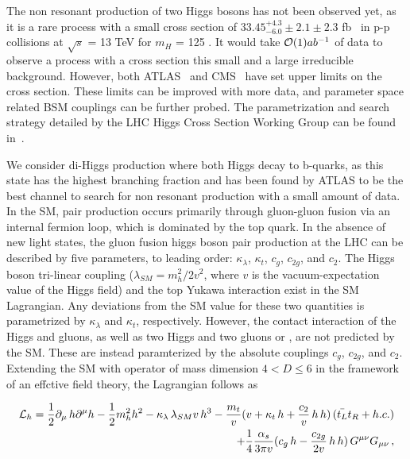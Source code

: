 
The non resonant production of two Higgs bosons has not been observed yet, as it is a rare process with a small cross section of $33.45^{+4.3}_{-6.0} \pm 2.1 \pm 2.3$ fb~\cite{MelladoGarcia:2150771,deFlorian:2013jea,Dawson:1998py,Borowka:2016ehy,deFlorian:2015moa} in p-p collisions at $\sqrt{s}$ = 13 TeV for $m_{H}$ = 125 \GeV. It would take ${\cal O}(1)ab^{-1}$ of data to observe a process with a cross section this small and a large irreducible background. However, both ATLAS~\cite{Aad:2015xja,Aaboud:2016xco} and CMS~\cite{Khachatryan:2016sey} have set upper limits on the cross section. These limits can be improved with more data, and parameter space related BSM couplings can be further probed. The parametrization and search strategy detailed by the LHC Higgs Cross Section Working Group can be found in~\cite{CarvalhoAntunesDeOliveira:2130724}.

We consider di-Higgs production where both Higgs decay to b-quarks, as this state has the highest branching fraction and has been found by ATLAS to be the best channel to search for non resonant production with a small amount of data. In the SM, pair production occurs primarily through gluon-gluon fusion via an internal fermion loop, which is dominated by the top quark. In the absence of new light states, the gluon fusion higgs boson pair production at the LHC can be described by five parameters, to leading order: $\kappa_{\lambda}$, $\kappa_{t}$, $c_g$, $c_{2g}$, and $c_2$. The Higgs boson tri-linear coupling ($\lambda_{SM}=m_h^2/2v^2$, where $v$ is the vacuum-expectation value of the Higgs field) and the top Yukawa interaction exist in the SM Lagrangian. Any deviations from the SM value for these two quantities is parametrized by $\kappa_{\lambda}$ and $\kappa_{t}$, respectively. However, the contact interaction of the Higgs and gluons, as well as two Higgs and two gluons or \ttbar, are not predicted by the SM. These are instead paramterized by the absolute couplings $c_g$, $c_{2g}$, and $c_2$. Extending the SM with operator of mass dimension $4<D\leq6$ in the framework of an effctive field theory, the Lagrangian follows as

\begin{eqnarray}
{\cal L}_h = 
\frac{1}{2} \partial_{\mu}\, h \partial^{\mu} h - \frac{1}{2} m_h^2 h^2 -
  {\kappa_{\lambda}}\,  \lambda_{SM} v\, h^3 
- \frac{ m_t}{v}(v+   {\kappa_t} \,   h  +  \frac{c_{2}}{v}   \, h\,  h ) \,( \bar{t_L}t_R + h.c.) \nonumber  \\ 
+ \frac{1}{4} \frac{\alpha_s}{3 \pi v} (   c_g \, h -  \frac{c_{2g}}{2 v} \, h\, h ) \,  G^{\mu \nu}G_{\mu\nu}\,,
\label{eq:lag}
\end{eqnarray}

